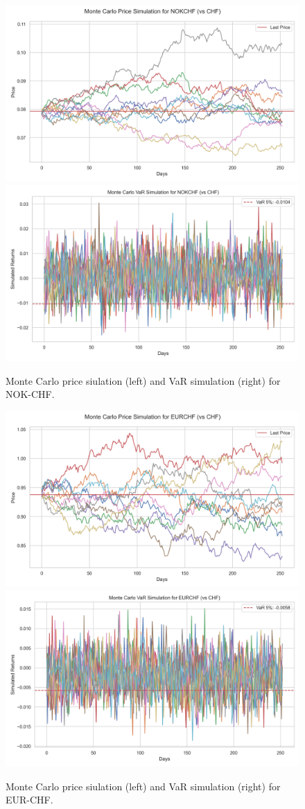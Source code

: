 \documentclass{article}
\begin{document}
\begin{figure}[H]
    \centering  \includegraphics[width=0.48\linewidth]{reports/figures/monte_carlo_price_simulation_NOKCHF_vs_CHF.png} \label{fig:monte_carlo_price_simulation_NOKCHF_vs_CHF}
    \includegraphics[width=0.48\linewidth]{reports/figures/monte_carlo_var_simulation_NOKCHF_vs_CHF.png} \label{fig:monte_carlo_var_simulation_NOKCHF_vs_CHF}
    \caption{\footnotesize Monte Carlo price siulation (left) and VaR simulation (right) for NOK-CHF.}
\end{figure}

\begin{figure}[H]
    \centering  \includegraphics[width=0.48\linewidth]{reports/figures/monte_carlo_price_simulation_EURCHF_vs_CHF.png} \label{fig:monte_carlo_price_simulation_EURCHF_vs_CHF}
    \includegraphics[width=0.48\linewidth]{reports/figures/monte_carlo_var_simulation_EURCHF_vs_CHF.png} \label{fig:monte_carlo_var_simulation_EURCHF_vs_CHF}
    \caption{\footnotesize Monte Carlo price siulation (left) and VaR simulation (right) for EUR-CHF.}
\end{figure}
\end{document}

